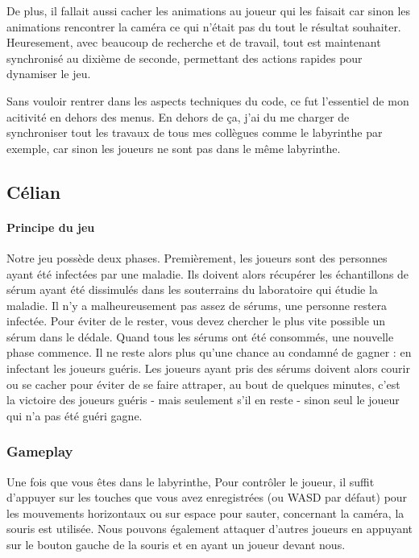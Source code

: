 \documentclass{article}
\begin{document}
De plus, il fallait aussi cacher les animations au joueur qui les faisait car 
sinon les animations rencontrer la caméra ce qui n'était pas du tout le résultat souhaiter. Heuresement, avec beaucoup de recherche et de travail, tout est maintenant 
synchronisé au dixième de seconde, permettant des actions rapides pour dynamiser le jeu.

Sans vouloir rentrer dans les aspects techniques du code, ce fut l'essentiel de mon acitivité en dehors des menus. En dehors de ça, j'ai du me charger de synchroniser tout les travaux de tous mes collègues comme le labyrinthe par exemple, car sinon les joueurs ne sont pas dans le même labyrinthe. 


\subsection{Célian}



\newpage
\paragraph{Principe du jeu}


Notre jeu possède deux phases.
Premièrement, les joueurs sont des personnes ayant été infectées par une maladie. Ils doivent alors récupérer les échantillons de sérum ayant été dissimulés dans les souterrains du laboratoire qui étudie la maladie. Il n'y a malheureusement pas assez de sérums, une personne restera infectée. Pour éviter de le rester, vous devez chercher le plus vite possible un sérum dans le dédale.
Quand tous les sérums ont été consommés, une nouvelle phase commence. Il ne reste alors plus qu'une chance au condamné de gagner : en infectant les joueurs guéris. Les joueurs ayant pris des sérums doivent alors courir ou se cacher pour éviter de se faire attraper, au bout de quelques minutes, c'est la victoire des joueurs guéris - mais seulement s'il en reste - sinon seul le joueur qui n'a pas été guéri gagne.




\subsubsection{Gameplay}


Une fois que vous êtes dans le labyrinthe,
Pour contrôler le joueur, il suffit d'appuyer sur les touches que vous avez enregistrées (ou WASD par défaut) pour les mouvements horizontaux ou sur espace pour sauter, concernant la caméra, la souris est utilisée. Nous pouvons également attaquer d'autres joueurs en appuyant sur le bouton gauche de la souris et en ayant un joueur devant nous.
\end{document}
